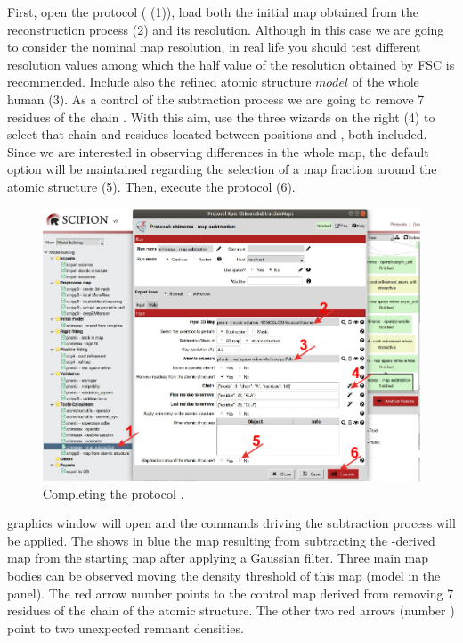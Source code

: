 \begin{itemize}
 First, open the \chimera {} protocol ( (1)), load both the initial map obtained from the reconstruction process (2) and its resolution. Although in this case we are going to consider the nominal map resolution, in real life you should test different resolution values among which the half value of the resolution obtained by FSC is recommended. Include also the refined atomic structure $model$ of the whole human  (3). As a control of the subtraction process we are going to remove 7 residues of the chain . With this aim, use the three wizards on the right (4) to select that chain and residues located between positions  and , both included. Since we are interested in observing differences in the whole map, the default option  will be maintained regarding the selection of a map fraction around the atomic structure (5). Then, execute the protocol (6). 
 
 \begin{figure}[H]
    \centering 
    \captionsetup{width=.9\linewidth} 
    \includegraphics[width=1\textwidth]{Images/Fig42}
    \caption{Completing the protocol .}
    \label{fig:chimera_map_subtract}
   \end{figure}
   
\chimera graphics window will open and the commands driving the subtraction process will be applied. The  shows in blue the map resulting from subtracting the -derived map from the starting map  after applying a Gaussian filter. Three main map bodies can be observed moving the density threshold of this map (model  in the  panel). The red arrow number  points to the control map derived from removing 7 residues of the chain  of the atomic structure. The other two red arrows (number ) point to two unexpected remnant densities. 


\end{itemize}
